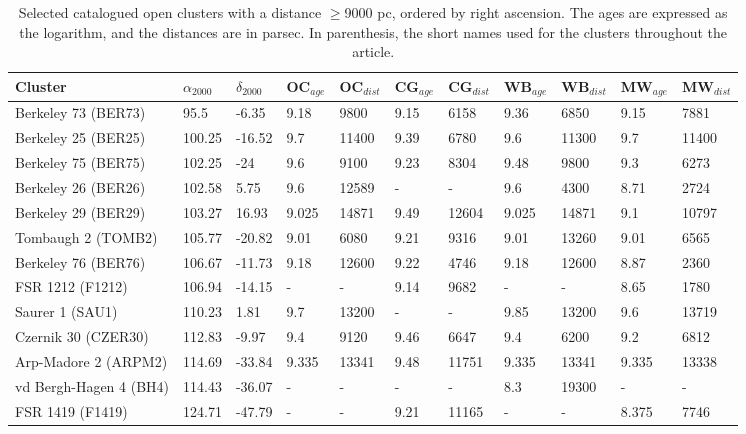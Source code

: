 \documentclass{aa}
\begin{document}
 \begin{table}
 \caption{Selected catalogued open clusters with a distance $\geq$9000 pc,
 ordered by right ascension. The ages are expressed as the logarithm, and the
 distances are in parsec. In parenthesis, the short names used for the clusters
 throughout the article.}
 \label{tab:clusters}
 \centering
 \begin{tabular}{lllllllllll}
 \hline\hline
 Cluster & $\alpha_{2000}$  & $\delta_{2000}$ & OC$_{age}$ & OC$_{dist}$ & CG$_{age}$ &
 CG$_{dist}$ & WB$_{age}$ & WB$_{dist}$ & MW$_{age}$ & MW$_{dist}$ \\
 \hline
 Berkeley 73 (BER73)     & 95.5   & -6.35     & 9.18  & 9800  & 9.15  & 6158  &
 9.36 & 6850 & 9.15  & 7881  \\
 Berkeley 25 (BER25)     & 100.25 & -16.52    & 9.7   & 11400 & 9.39  & 6780  &
 9.6   & 11300 &  9.7   & 11400 \\
 Berkeley  75 (BER75)     & 102.25 & -24       & 9.6   & 9100  & 9.23  &  8304 
 & 9.48  & 9800  & 9.3   & 6273  \\
 Berkeley  26 (BER26)     & 102.58 & 5.75      & 9.6   & 12589 & -   & -   & 9.6
 & 4300  & 8.71  & 2724  \\
 Berkeley  29 (BER29)     & 103.27 & 16.93     & 9.025 & 14871 & 9.49  & 12604 &
 9.025 & 14871 & 9.1   & 10797 \\
 Tombaugh 2 (TOMB2)     & 105.77 & -20.82    & 9.01  & 6080  & 9.21  & 9316  &
 9.01 & 13260 & 9.01  & 6565  \\
 Berkeley 76 (BER76)     & 106.67 & -11.73    & 9.18  & 12600 & 9.22  & 4746  &
 9.18 & 12600 & 8.87  & 2360  \\
 FSR 1212 (F1212)   & 106.94 & -14.15    & -   & -   & 9.14  & 9682  & -   & -
 & 8.65  & 1780  \\
 Saurer 1 (SAU1)   & 110.23 & 1.81      & 9.7   & 13200 & -   & -   & 9.85  &
 13200 & 9.6   & 13719 \\
 Czernik 30 (CZER30)    & 112.83 & -9.97     & 9.4   & 9120  & 9.46  & 6647  &
 9.4 & 6200  & 9.2   & 6812  \\
 Arp-Madore 2 (ARPM2)     & 114.69 & -33.84    & 9.335 & 13341 & 9.48  & 11751 &
 9.335 & 13341 & 9.335 & 13338 \\
 vd Bergh-Hagen 4 (BH4)     & 114.43 & -36.07    & -   & -   & -   & -  
 & 8.3   & 19300 & -   & -   \\
 FSR 1419 (F1419)   & 124.71 & -47.79    & -   & -   & 9.21  & 11165 & -   & -   & 8.375 & 7746  \\

\end{tabular}
\end{table}
\end{document}
